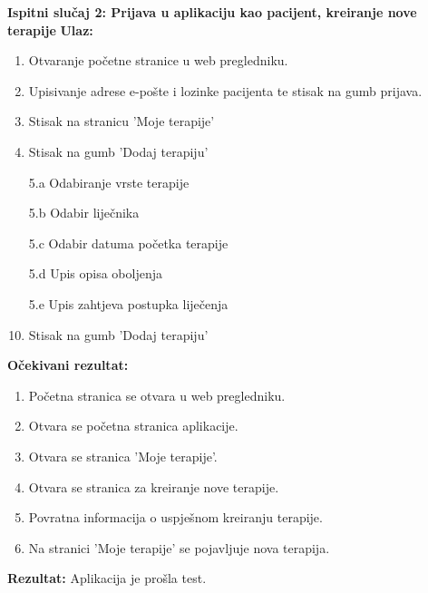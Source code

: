 \textbf{Ispitni slučaj 2: Prijava u aplikaciju kao pacijent, kreiranje nove terapije}
\textbf{Ulaz:}
\begin{enumerate}
    \item Otvaranje početne stranice u web pregledniku.
    \item Upisivanje adrese e-pošte i lozinke pacijenta te stisak na gumb prijava.
    \item Stisak na stranicu 'Moje terapije'
    \item Stisak na gumb 'Dodaj terapiju'
    \item[5.a] Odabiranje vrste terapije
    \item[5.b] Odabir liječnika
    \item[5.c] Odabir datuma početka terapije
    \item[5.d] Upis opisa oboljenja
    \item[5.e] Upis zahtjeva postupka liječenja
    \item Stisak na gumb 'Dodaj terapiju'
\end{enumerate}
\textbf{Očekivani rezultat:}
\begin{enumerate}
    \item Početna stranica se otvara u web pregledniku.
    \item Otvara se početna stranica aplikacije.
    \item Otvara se stranica 'Moje terapije'.
    \item Otvara se stranica za kreiranje nove terapije.
    \item Povratna informacija o uspješnom kreiranju terapije.
    \item Na stranici 'Moje terapije' se pojavljuje nova terapija.
\end{enumerate}
\textbf{Rezultat:} Aplikacija je prošla test.

